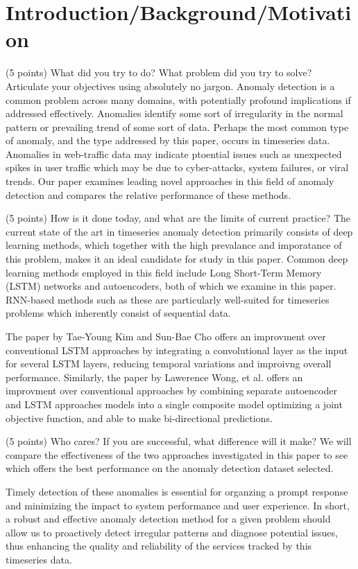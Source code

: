 \documentclass[10pt,twocolumn,letterpaper]{article}
\begin{document}
\section{Introduction/Background/Motivation}

(5 points) What did you try to do? What problem did you try to solve? Articulate your objectives using absolutely no jargon. 
Anomaly detection is a common problem across many domains, with potentially profound implications if addressed effectively. Anomalies identify some sort of 
irregularity in the normal pattern or prevailing trend of some sort of data. Perhaps the most common type of anomaly, and the type addressed by this paper, occurs in
timeseries data. Anomalies in web-traffic data may indicate ptoential issues such as unexpected spikes in user traffic which may be due to cyber-attacks, system failures, 
or viral trends. Our paper examines leading novel approaches in this field of anomaly detection and compares the relative performance of these methods. 

(5 points) How is it done today, and what are the limits of current practice?
The current state of the art in timeseries anomaly detection primarily consists of deep learning methods, which together with the high prevalance and imporatance of this problem, 
makes it an ideal candidate for study in this paper. Common deep learning methods employed in this field include Long Short-Term Memory (LSTM) networks and autoencoders, both of which
we examine in this paper. RNN-based methods such as these are particularly well-suited for timeseries problems which inherently consist of sequential data.

The paper by Tae-Young Kim and Sun-Bae Cho offers an improvment over conventional LSTM approaches by integrating a convolutional layer as the input for several LSTM
layers, reducing temporal variations and improivng overall performance. Similarly, the paper by Lawerence Wong, et al. offers an improvment over conventional approaches by combining 
separate autoencoder and LSTM approaches models into a single composite model optimizing a joint objective function, and able to make bi-directional predictions.

(5 points) Who cares? If you are successful, what difference will it make? 
We will compare the effectiveness of the two approaches investigated in this paper to see which offers the best performance on the anomaly detection dataset selected. 

Timely detection of these anomalies is essential for organzing a prompt response and minimizing the impact to system performance and user experience. 
In short, a robust and effective anomaly detection method for a given problem should allow us to proactively detect irregular patterns and diagnose potential issues, thus
enhancing the quality and reliability of the services tracked by this timeseries data. 
\end{document}
